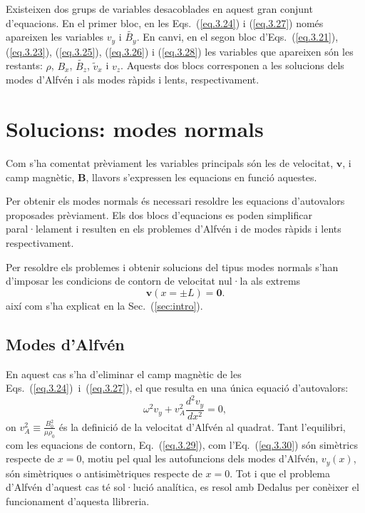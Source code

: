 Existeixen dos grups de variables desacoblades en aquest gran conjunt d'equacions.
En el primer bloc, en les Eqs.~(\ref{eq.3.24}) i (\ref{eq.3.27}) només apareixen les variables $v_{y}$ i $\tilde{B_{y}}$.
En canvi, en el segon bloc d'Eqs.~(\ref{eq.3.21}), (\ref{eq.3.23}), (\ref{eq.3.25}), (\ref{eq.3.26}) i (\ref{eq.3.28})
les variables que apareixen són les restants: $\rho$, $B_{x}$, $\tilde{B_{z}}$, $\tilde{v}_{x}$ i $v_{z}$.
Aquests dos blocs corresponen a les solucions dels modes d'Alfvén i als modes ràpids i lents, respectivament.



\section{Solucions: modes normals} \label{subsec:modes_normals}
Com s'ha comentat prèviament les variables principals són les de velocitat, $\bm{v}$, i camp magnètic, $\bm{B}$,
llavors s'expressen les equacions en funció aquestes.

Per obtenir els modes normals és necessari resoldre les equacions d'autovalors proposades prèviament.
Els dos blocs d'equacions es poden simplificar paral·lelament i resulten en els problemes d'Alfvén i de modes ràpids i lents respectivament.

Per resoldre els problemes i obtenir solucions del tipus modes normals s'han d'imposar les condicions de contorn de velocitat nul·la als extrems
\begin{equation}
	\bm{v} (x = \pm L) = \bm{0}. \tag{3.29} \label{eq.3.29}
\end{equation}
així com s'ha explicat en la Sec.~(\ref{sec:intro}).


\subsection{Modes d'Alfvén}
En aquest cas s'ha d'eliminar el camp magnètic de les Eqs.~(\ref{eq.3.24})~i~(\ref{eq.3.27}), el que resulta en una única equació d'autovalors:
\begin{equation}
	\omega^2  v_{y} + v_A^2 \frac{d^2v_{y}}{dx^2} = 0, \tag{3.30} \label{eq.3.30}
\end{equation}
on $v_A^2 \equiv \frac{B_0^2}{\mu \rho_0}$ és la definició de la velocitat d'Alfvén al quadrat.
Tant l'equilibri, com les equacions de contorn, Eq.~(\ref{eq.3.29}), com l'Eq.~(\ref{eq.3.30}) són simètrics respecte de $x=0$,
motiu pel qual les autofuncions dels modes d'Alfvén, $v_y(x)$, són simètriques o antisimètriques respecte de $x=0$.
Tot i que el problema d'Alfvén d'aquest cas té sol·lució analítica,
es resol amb Dedalus per conèixer el funcionament d'aquesta llibreria.


